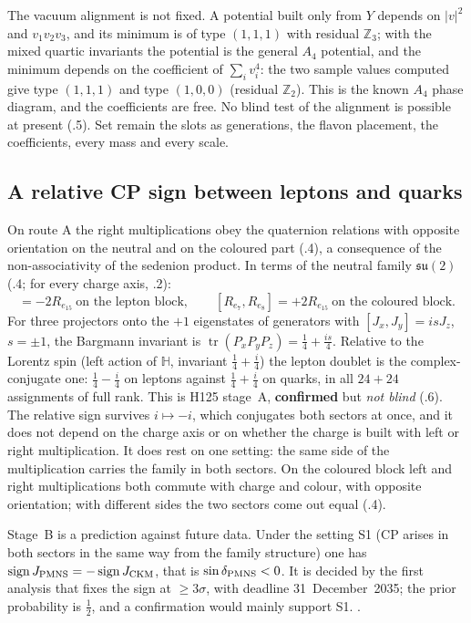 The vacuum alignment is not fixed. A potential built only from $Y$ depends on $|v|^2$ and $v_1v_2v_3$, and its minimum is of
type $(1,1,1)$ with residual $\mathbb Z_3$; with the mixed quartic invariants the potential is the general $A_4$ potential,
and the minimum depends on the coefficient of $\sum_iv_i^4$: the two sample values computed give type $(1,1,1)$ and type $(1,0,0)$ (residual $\mathbb Z_2$). This is
the known $A_4$ phase diagram, and the coefficients are free. No blind test of the alignment is possible at present
(.5). Set remain the slots as generations, the flavon placement, the coefficients, every mass and every scale.

\subsection{A relative CP sign between leptons and quarks}
\label{sec:B-cp}

On route A the right multiplications obey the quaternion relations with opposite orientation on the neutral and on the
coloured part (.4), a consequence of the non-associativity of the sedenion product. In terms of the neutral family
$\mathfrak{su}(2)$ (.4; for every charge axis, .2):
\begin{equation}
 [R_{e_7},R_{e_8}]=-2R_{e_{15}}\ \text{on the lepton block},\qquad [R_{e_7},R_{e_8}]=+2R_{e_{15}}\ \text{on the coloured block}.
 \label{eq:B-cp}
\end{equation}
For three projectors onto the $+1$ eigenstates of generators with $[J_x,J_y]=isJ_z$, $s=\pm1$, the Bargmann invariant is
$\operatorname{tr}(P_xP_yP_z)=\tfrac14+\tfrac{is}{4}$. Relative to the Lorentz spin (left action of $\mathbb H$, invariant
$\tfrac14+\tfrac i4$) the lepton doublet is the complex-conjugate one: $\tfrac14-\tfrac i4$ on leptons against
$\tfrac14+\tfrac i4$ on quarks, in all $24+24$ assignments of full rank. This is H125 stage~A, \textbf{confirmed} but
\emph{not blind} (.6). The relative sign survives $i\mapsto-i$, which conjugates both sectors at once, and it does not depend on the charge axis
or on whether the charge is built with left or right multiplication. It does rest on one setting: the same side of the
multiplication carries the family in both sectors. On the coloured block left and right multiplications both commute with
charge and colour, with opposite orientation; with different sides the two sectors come out equal (.4).

Stage~B is a prediction against future data. Under the setting S1 (CP arises in both sectors in the same way from the
family structure) one has $\operatorname{sign}J_{\rm PMNS}=-\operatorname{sign}J_{\rm CKM}$, that is
$\sin\delta_{\rm PMNS}<0$. It is decided by the first analysis that fixes the sign at $\ge3\sigma$, with deadline
31~December~2035; the prior probability is $\tfrac12$, and a confirmation would mainly support S1. \Open.

